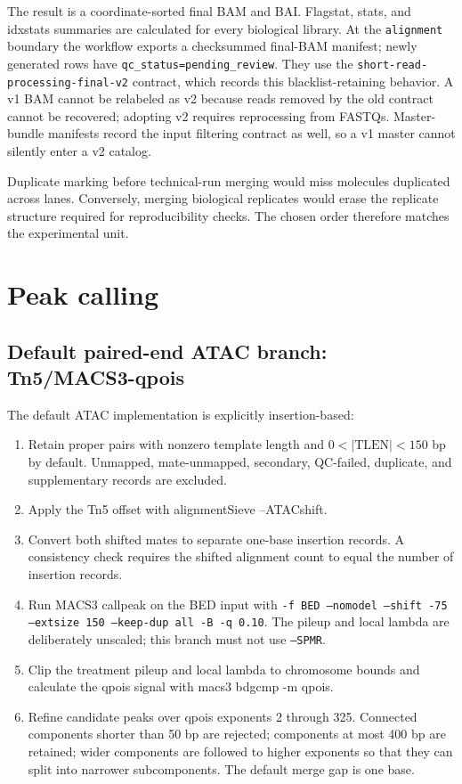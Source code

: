 \documentclass[11pt]{article}
\newcommand{\stage}[1]{\texttt{#1}}
\newcommand{\software}[1]{\textsf{#1}}
\begin{document}
The result is a coordinate-sorted final BAM and BAI.  Flagstat, stats, and
idxstats summaries are calculated for every biological library.  At the
\stage{alignment} boundary the workflow exports a checksummed final-BAM
manifest; newly generated rows have \texttt{qc\_status=pending\_review}.
They use the \texttt{short-read-processing-final-v2} contract, which records
this blacklist-retaining behavior.  A v1 BAM cannot be relabeled as v2 because
reads removed by the old contract cannot be recovered; adopting v2 requires
reprocessing from FASTQs.  Master-bundle manifests record the input filtering
contract as well, so a v1 master cannot silently enter a v2 catalog.

Duplicate marking before technical-run merging would miss molecules duplicated
across lanes.  Conversely, merging biological replicates would erase the
replicate structure required for reproducibility checks.  The chosen order
therefore matches the experimental unit.

\section{Peak calling}

\subsection{Default paired-end ATAC branch: Tn5/MACS3-qpois}

The default ATAC implementation is explicitly insertion-based:

\begin{enumerate}
  \item Retain proper pairs with nonzero template length and
  \(0 < |\mathrm{TLEN}| < 150\) bp by default.  Unmapped, mate-unmapped,
  secondary, QC-failed, duplicate, and supplementary records are excluded.
  \item Apply the Tn5 offset with \software{alignmentSieve --ATACshift}.
  \item Convert both shifted mates to separate one-base insertion records.  A
  consistency check requires the shifted alignment count to equal the number
  of insertion records.
  \item Run \software{MACS3 callpeak} on the BED input with
  \texttt{-f BED --nomodel --shift -75 --extsize 150 --keep-dup all -B
  -q 0.10}.  The pileup and local lambda are deliberately unscaled; this
  branch must not use \texttt{--SPMR}.
  \item Clip the treatment pileup and local lambda to chromosome bounds and
  calculate the qpois signal with \software{macs3 bdgcmp -m qpois}.
  \item Refine candidate peaks over qpois exponents 2 through 325.  Connected
  components shorter than 50 bp are rejected; components at most 400 bp are
  retained; wider components are followed to higher exponents so that they can
  split into narrower subcomponents.  The default merge gap is one base.
\end{enumerate}
\end{document}
